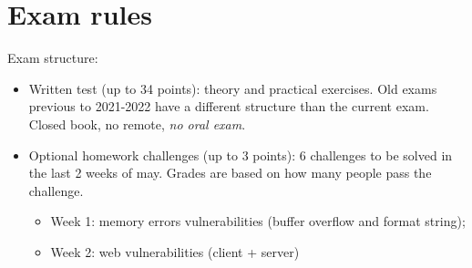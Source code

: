\section*{Exam rules}

Exam structure:
\begin{itemize}
	\item Written test (up to 34 points): theory and practical exercises. Old exams previous to 2021-2022 have a different structure than the current exam. Closed book, no remote, \textit{no oral exam}.
	\item Optional homework challenges (up to 3 points): 6 challenges to be solved in the last 2 weeks of may. Grades are based on how many people pass the challenge.
	      \begin{itemize}
		      \item Week 1: memory errors vulnerabilities (buffer overflow and format string);
		      \item Week 2: web vulnerabilities (client + server)
	      \end{itemize}
\end{itemize}
